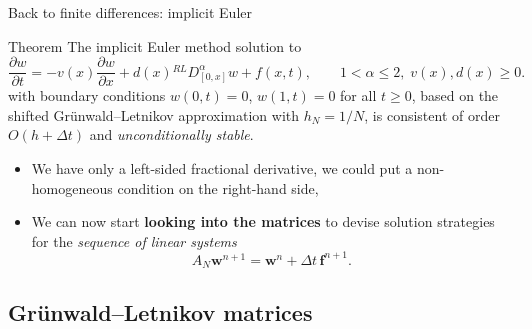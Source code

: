 \documentclass[aspectratio=169,xcolor=dvipsnames]{beamer}
\begin{document}
\begin{frame}{Back to finite differences: implicit Euler}
	\begin{alertblock}{Theorem \parencite{MR2091131}}
	The implicit Euler method solution to
	\[
	\frac{\partial w}{\partial t} = - v(x) \frac{\partial w}{\partial x} + d(x) {}^{RL}D_{[0,x]}^\alpha w + f(x,t), \qquad 1 < \alpha \leq 2, \;v(x),d(x) \geq 0.
	\]
	with boundary conditions $w(0,t) = 0$, $w(1,t) = 0$ for all $t \geq 0$, based on the shifted Gr\"unwald--Letnikov approximation with $h_N = 1/N$, is consistent
	of order $O(h + \Delta t)$ and \emph{unconditionally stable}.
	
	\end{alertblock}
\begin{itemize}
	\item[\faEye] We have only a left-sided fractional derivative, we could put a non-homogeneous condition on the right-hand side,
	\item[\faMagic] We can now start \textbf{looking into the matrices} to devise solution strategies for the \emph{sequence of linear systems}
	\[
	A_N \mathbf{w}^{n+1} = \mathbf{w}^n + \Delta t\,\mathbf{f}^{n+1}.
	\]  
\end{itemize}
\end{frame}

\subsection{Gr\"unwald--Letnikov matrices}
\end{document}

